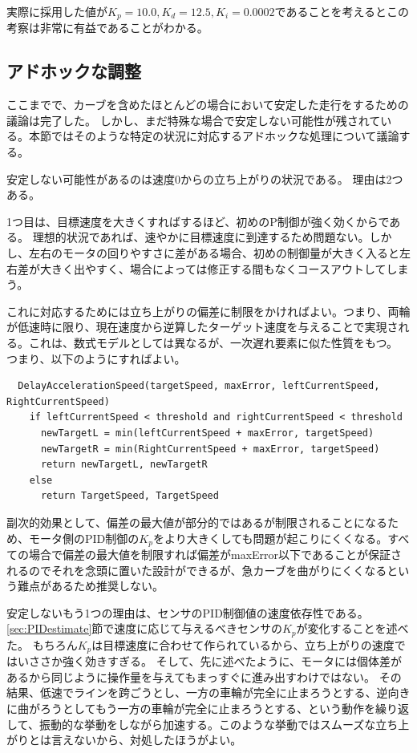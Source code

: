 \documentclass{ltjsreport}
\begin{document}
実際に採用した値が$K_p=10.0, K_d = 12.5, K_i = 0.0002$であることを考えるとこの考察は非常に有益であることがわかる。



\subsection{アドホックな調整}
ここまでで、カーブを含めたほとんどの場合において安定した走行をするための議論は完了した。
しかし、まだ特殊な場合で安定しない可能性が残されている。本節ではそのような特定の状況に対応するアドホックな処理について議論する。

安定しない可能性があるのは速度0からの立ち上がりの状況である。
理由は2つある。

1つ目は、目標速度を大きくすればするほど、初めのP制御が強く効くからである。
理想的状況であれば、速やかに目標速度に到達するため問題ない。しかし、左右のモータの回りやすさに差がある場合、初めの制御量が大きく入ると左右差が大きく出やすく、場合によっては修正する間もなくコースアウトしてしまう。

これに対応するためには立ち上がりの偏差に制限をかければよい。つまり、両輪が低速時に限り、現在速度から逆算したターゲット速度を与えることで実現される。これは、数式モデルとしては異なるが、一次遅れ要素に似た性質をもつ。
つまり、以下のようにすればよい。
\begin{verbatim}
  DelayAccelerationSpeed(targetSpeed, maxError, leftCurrentSpeed, RightCurrentSpeed)
    if leftCurrentSpeed < threshold and rightCurrentSpeed < threshold
      newTargetL = min(leftCurrentSpeed + maxError, targetSpeed)
      newTargetR = min(RightCurrentSpeed + maxError, targetSpeed)
      return newTargetL, newTargetR
    else
      return TargetSpeed, TargetSpeed
\end{verbatim}
副次的効果として、偏差の最大値が部分的ではあるが制限されることになるため、モータ側のPID制御の$K_p$をより大きくしても問題が起こりにくくなる。すべての場合で偏差の最大値を制限すれば偏差がmaxError以下であることが保証されるのでそれを念頭に置いた設計ができるが、急カーブを曲がりにくくなるという難点があるため推奨しない。

安定しないもう1つの理由は、センサのPID制御値の速度依存性である。
\ref{sec:PIDestimate}節で速度に応じて与えるべきセンサの$K_p$が変化することを述べた。
もちろん$K_p$は目標速度に合わせて作られているから、立ち上がりの速度ではいささか強く効きすぎる。
そして、先に述べたように、モータには個体差があるから同じように操作量を与えてもまっすぐに進み出すわけではない。
その結果、低速でラインを跨ごうとし、一方の車輪が完全に止まろうとする、逆向きに曲がろうとしてもう一方の車輪が完全に止まろうとする、という動作を繰り返して、振動的な挙動をしながら加速する。このような挙動ではスムーズな立ち上がりとは言えないから、対処したほうがよい。
\end{document}
